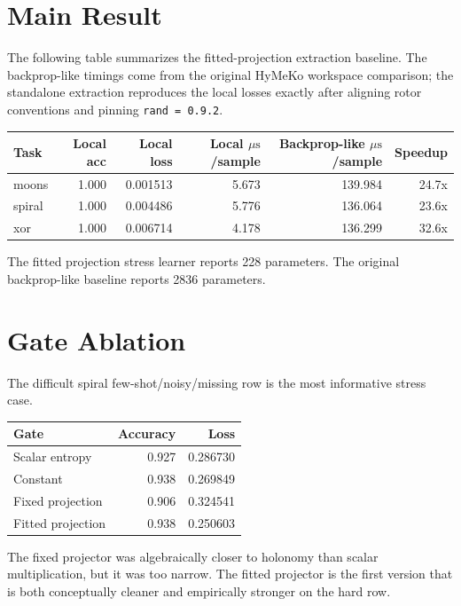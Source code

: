 \documentclass[11pt]{article}
\newcommand{\us}{\ensuremath{\mu\mathrm{s}}}
\begin{document}
\section{Main Result}

The following table summarizes the fitted-projection extraction baseline. The
backprop-like timings come from the original HyMeKo workspace comparison; the
standalone extraction reproduces the local losses exactly after aligning rotor
conventions and pinning \texttt{rand = 0.9.2}.

\begin{center}
\begin{tabular}{lrrrrr}
\toprule
Task & Local acc & Local loss & Local \us/sample & Backprop-like \us/sample & Speedup\\
\midrule
moons  & 1.000 & 0.001513 & 5.673 & 139.984 & 24.7x\\
spiral & 1.000 & 0.004486 & 5.776 & 136.064 & 23.6x\\
xor    & 1.000 & 0.006714 & 4.178 & 136.299 & 32.6x\\
\bottomrule
\end{tabular}
\end{center}

The fitted projection stress learner reports 228 parameters. The original
backprop-like baseline reports 2836 parameters.

\section{Gate Ablation}

The difficult spiral few-shot/noisy/missing row is the most informative stress
case.

\begin{center}
\begin{tabular}{lrr}
\toprule
Gate & Accuracy & Loss\\
\midrule
Scalar entropy & 0.927 & 0.286730\\
Constant & 0.938 & 0.269849\\
Fixed projection & 0.906 & 0.324541\\
Fitted projection & 0.938 & 0.250603\\
\bottomrule
\end{tabular}
\end{center}

The fixed projector was algebraically closer to holonomy than scalar
multiplication, but it was too narrow. The fitted projector is the first version
that is both conceptually cleaner and empirically stronger on the hard row.
\end{document}
